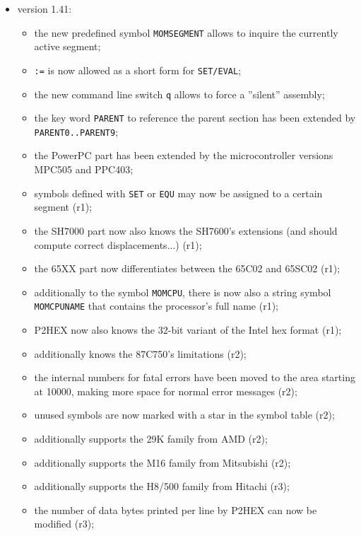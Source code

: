 \documentclass[12pt,twoside]{report}
\newcommand{\tty}[1]{{\tt #1}}
\begin{document}
\begin{itemize}
\item{version 1.41:
      \begin{itemize}
      \item{the new predefined symbol \tty{MOMSEGMENT} allows to
            inquire the currently active segment;}
      \item{\tty{:=} is now allowed as a short form for \tty{SET/EVAL};}
      \item{the new command line switch \tty{q} allows to force a
            ''silent'' assembly;}
      \item{the key word \tty{PARENT} to reference the parent section
            has been extended by \tty{PARENT0..PARENT9};}
      \item{the PowerPC part has been extended by the
            microcontroller versions MPC505 and PPC403;}
      \item{symbols defined with \tty{SET} or \tty{EQU} may now be assigned
            to a certain segment (r1);}
      \item{the SH7000 part now also knows the SH7600's
            extensions (and should compute correct
            displacements...) (r1);}
      \item{the 65XX part now differentiates between the 65C02
            and 65SC02 (r1);}
      \item{additionally to the symbol \tty{MOMCPU}, there is now also
            a string symbol \tty{MOMCPUNAME} that contains the
            processor's full name (r1);}
      \item{P2HEX now also knows the 32-bit variant of the Intel
            hex format (r1);}
      \item{additionally knows the 87C750's limitations (r2);}
      \item{the internal numbers for fatal errors have been moved
            to the area starting at 10000, making more space for
            normal error messages (r2);}
      \item{unused symbols are now marked with a star in the
            symbol table (r2);}
      \item{additionally supports the 29K family from AMD (r2);}
      \item{additionally supports the M16 family from Mitsubishi
            (r2);}
      \item{additionally supports the H8/500 family from Hitachi
            (r3);}
      \item{the number of data bytes printed per line by P2HEX
            can now be modified (r3);}

\end{itemize}}
\end{itemize}
\end{document}
